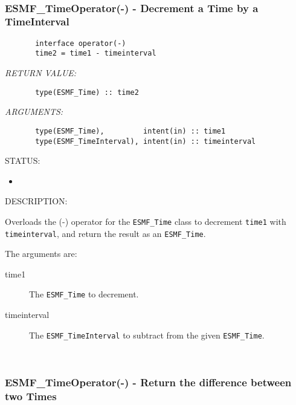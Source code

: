  
\mbox{}\hrulefill\ 
 
\subsubsection [ESMF\_TimeOperator(-)] {ESMF\_TimeOperator(-) - Decrement a Time by a TimeInterval}


  
\begin{verbatim}       interface operator(-)
       time2 = time1 - timeinterval      
   \end{verbatim}{\em RETURN VALUE:}
\begin{verbatim}       type(ESMF_Time) :: time2
   \end{verbatim}{\em ARGUMENTS:}
\begin{verbatim}       type(ESMF_Time),         intent(in) :: time1
       type(ESMF_TimeInterval), intent(in) :: timeinterval\end{verbatim}
{\sf STATUS:}
   \begin{itemize}
   \item{}
   \end{itemize}
  
{\sf DESCRIPTION:\\ }


       Overloads the (-) operator for the {\tt ESMF\_Time} class to decrement
       {\tt time1} with {\tt timeinterval}, and return the result as an
       {\tt ESMF\_Time}.
   
       The arguments are:      
       \begin{description}
       \item[time1]
            The {\tt ESMF\_Time} to decrement.
       \item[timeinterval]
            The {\tt ESMF\_TimeInterval} to subtract from the given
            {\tt ESMF\_Time}.
       \end{description}
   
 
\mbox{}\hrulefill\ 
 
\subsubsection [ESMF\_TimeOperator(-)] {ESMF\_TimeOperator(-) - Return the difference between two Times}


